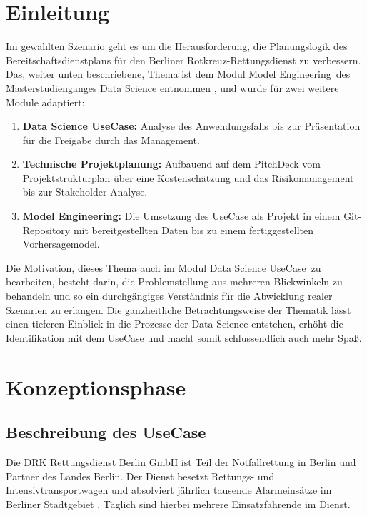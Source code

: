 \chapter{Einleitung}

Im gewählten Szenario geht es um die Herausforderung, die Planungslogik des Bereitschaftsdienstplans für den Berliner Rotkreuz-Rettungsdienst zu verbessern. Das, weiter unten beschriebene, Thema ist dem Modul \glqq Model Engineering\grqq\ des Masterstudienganges Data Science entnommen \citep{pak_aufgabenstellung_dlmdwme01_2024}, und wurde für zwei weitere Module adaptiert: 

\begin{enumerate}
  \itemsep-8pt
  \item \textbf{Data Science UseCase:} Analyse des Anwendungsfalls bis zur Präsentation für die Freigabe durch das Management.
  \item \textbf{Technische Projektplanung:} Aufbauend auf dem PitchDeck vom Projektstrukturplan über eine Kostenschätzung und das Risikomanagement bis zur Stakeholder-Analyse.
  \item \textbf{Model Engineering:} Die Umsetzung des UseCase als Projekt in einem Git-Repository mit bereitgestellten Daten bis zu einem fertiggestellten Vorhersagemodel.
\end{enumerate}

Die Motivation, dieses Thema auch im Modul \glqq Data Science UseCase\grqq\ zu bearbeiten,  besteht darin, die Problemstellung aus mehreren Blickwinkeln zu behandeln und so ein durchgängiges Verständnis für die Abwicklung realer Szenarien zu erlangen. Die ganzheitliche Betrachtungsweise der Thematik lässt einen tieferen Einblick in die Prozesse der Data Science entstehen, erhöht die Identifikation mit dem UseCase und macht somit schlussendlich auch mehr Spaß.	

\chapter{Konzeptionsphase}

\section{Beschreibung des UseCase}

Die DRK Rettungsdienst Berlin GmbH ist Teil der Notfallrettung in Berlin und Partner des Landes Berlin. Der Dienst besetzt Rettungs- und Intensivtransportwagen und absolviert jährlich tausende Alarmeinsätze im Berliner Stadtgebiet \citep{drk_rettungsdienst_2024}. Täglich sind hierbei mehrere Einsatzfahrende im Dienst. 


